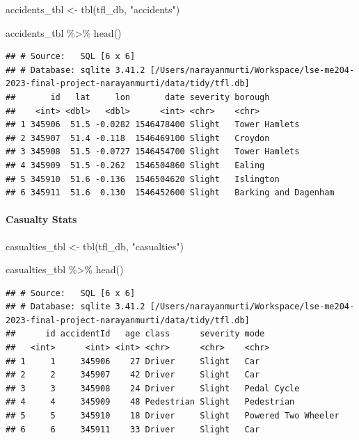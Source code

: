 \documentclass[
]{article}
\newenvironment{Shaded}{\begin{snugshade}}{\end{snugshade}}
\newcommand{\FunctionTok}[1]{\textcolor[rgb]{0.00,0.00,0.00}{#1}}
\newcommand{\NormalTok}[1]{#1}
\newcommand{\OtherTok}[1]{\textcolor[rgb]{0.56,0.35,0.01}{#1}}
\newcommand{\SpecialCharTok}[1]{\textcolor[rgb]{0.00,0.00,0.00}{#1}}
\newcommand{\StringTok}[1]{\textcolor[rgb]{0.31,0.60,0.02}{#1}}
\begin{document}
\begin{Shaded}
\begin{Highlighting}[]
\NormalTok{accidents\_tbl }\OtherTok{\textless{}{-}} \FunctionTok{tbl}\NormalTok{(tfl\_db, }\StringTok{"accidents"}\NormalTok{)}

\NormalTok{accidents\_tbl }\SpecialCharTok{\%\textgreater{}\%}
  \FunctionTok{head}\NormalTok{()}
\end{Highlighting}
\end{Shaded}

\begin{verbatim}
## # Source:   SQL [6 x 6]
## # Database: sqlite 3.41.2 [/Users/narayanmurti/Workspace/lse-me204-2023-final-project-narayanmurti/data/tidy/tfl.db]
##       id   lat     lon       date severity borough             
##    <int> <dbl>   <dbl>      <int> <chr>    <chr>               
## 1 345906  51.5 -0.0282 1546478400 Slight   Tower Hamlets       
## 2 345907  51.4 -0.118  1546469100 Slight   Croydon             
## 3 345908  51.5 -0.0727 1546454700 Slight   Tower Hamlets       
## 4 345909  51.5 -0.262  1546504860 Slight   Ealing              
## 5 345910  51.6 -0.136  1546504620 Slight   Islington           
## 6 345911  51.6  0.130  1546452600 Slight   Barking and Dagenham
\end{verbatim}

\hypertarget{casualty-stats}{%
\paragraph{Casualty Stats}\label{casualty-stats}}

\begin{Shaded}
\begin{Highlighting}[]
\NormalTok{casualties\_tbl }\OtherTok{\textless{}{-}} \FunctionTok{tbl}\NormalTok{(tfl\_db, }\StringTok{"casualties"}\NormalTok{)}

\NormalTok{casualties\_tbl }\SpecialCharTok{\%\textgreater{}\%}
  \FunctionTok{head}\NormalTok{()}
\end{Highlighting}
\end{Shaded}

\begin{verbatim}
## # Source:   SQL [6 x 6]
## # Database: sqlite 3.41.2 [/Users/narayanmurti/Workspace/lse-me204-2023-final-project-narayanmurti/data/tidy/tfl.db]
##      id accidentId   age class      severity mode               
##   <int>      <int> <int> <chr>      <chr>    <chr>              
## 1     1     345906    27 Driver     Slight   Car                
## 2     2     345907    42 Driver     Slight   Car                
## 3     3     345908    24 Driver     Slight   Pedal Cycle        
## 4     4     345909    48 Pedestrian Slight   Pedestrian         
## 5     5     345910    18 Driver     Slight   Powered Two Wheeler
## 6     6     345911    33 Driver     Slight   Car
\end{verbatim}
\end{document}
